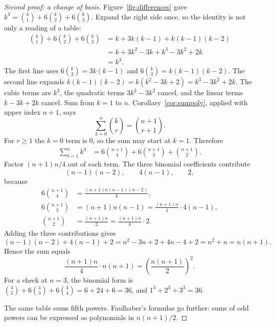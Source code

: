 \begin{proof}[Second proof: a change of basis]
Figure~\ref{fig:differences} gave $k^3=\binom k1+6\binom k2+6\binom k3$. Expand the right side once, so the identity is not only a reading of a table:
\begin{align*}
\binom k1+6\binom k2+6\binom k3
&=k+3k(k-1)+k(k-1)(k-2)\\
&=k+3k^2-3k+k^3-3k^2+2k\\
&=k^3.
\end{align*}
The first line uses $6\binom k2=3k(k-1)$ and $6\binom k3=k(k-1)(k-2)$. The second line expands $k(k-1)(k-2)=k(k^2-3k+2)=k^3-3k^2+2k$. The cubic terms are $k^3$, the quadratic terms $3k^2-3k^2$ cancel, and the linear terms $k-3k+2k$ cancel. Sum from $k=1$ to $n$. Corollary~\ref{cor:sumpoly}, applied with upper index $n+1$, says
\[
\sum_{k=0}^{n}\binom kr=\binom{n+1}{r+1}.
\]
For $r\ge1$ the $k=0$ term is $0$, so the sum may start at $k=1$. Therefore
\begin{align*}
\sum_{k=1}^n k^3
&=6\binom{n+1}{4}+6\binom{n+1}{3}+\binom{n+1}{2}.
\end{align*}
Factor $(n+1)n/4$ out of each term. The three binomial coefficients contribute
\[
(n-1)(n-2),\qquad 4(n-1),\qquad 2,
\]
because
\begin{align*}
6\binom{n+1}{4}&=\frac{(n+1)n(n-1)(n-2)}{4},\\
6\binom{n+1}{3}&=(n+1)n(n-1)=\frac{(n+1)n}{4}\cdot4(n-1),\\
\binom{n+1}{2}&=\frac{(n+1)n}{2}=\frac{(n+1)n}{4}\cdot2.
\end{align*}
Adding the three contributions gives
\[
(n-1)(n-2)+4(n-1)+2=n^2-3n+2+4n-4+2=n^2+n=n(n+1).
\]
Hence the sum equals
\[
\frac{(n+1)n}{4}\cdot n(n+1)=\left(\frac{n(n+1)}{2}\right)^2.
\]
For a check at $n=3$, the binomial form is $\binom42+6\binom43+6\binom44=6+24+6=36$, and $1^3+2^3+3^3=36$.

The same table sums fifth powers. Faulhaber's formulas go further: sums of odd powers can be expressed as polynomials in $n(n+1)/2$.
\end{proof}

